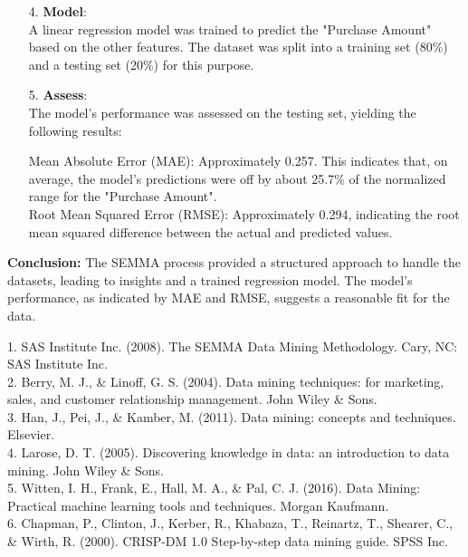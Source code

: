 \documentclass{article}
\begin{document}
\begin{itemize}
\item[4.]\textbf{Model}:\\A linear regression model was trained to predict the "Purchase Amount" based on the other features. The dataset was split into a training set (80\%) and a testing set (20\%) for this purpose.
\item[5.]\textbf{Assess}:\\The model's performance was assessed on the testing set, yielding the following results:

Mean Absolute Error (MAE): Approximately 0.257. This indicates that, on average, the model's predictions were off by about 25.7\% of the normalized range for the "Purchase Amount".\\
Root Mean Squared Error (RMSE): Approximately 0.294, indicating the root mean squared difference between the actual and predicted values.
\end{itemize}
\textbf{Conclusion:}
The SEMMA process provided a structured approach to handle the datasets, leading to insights and a trained regression model. The model's performance, as indicated by MAE and RMSE, suggests a reasonable fit for the data.


1. SAS Institute Inc. (2008). The SEMMA Data Mining Methodology. Cary, NC: SAS Institute Inc.\\
2. Berry, M. J., \& Linoff, G. S. (2004). Data mining techniques: for marketing, sales, and customer relationship management. John Wiley \& Sons.\\
3. Han, J., Pei, J., \& Kamber, M. (2011). Data mining: concepts and techniques. Elsevier.\\
4. Larose, D. T. (2005). Discovering knowledge in data: an introduction to data mining. John Wiley \& Sons.\\
5. Witten, I. H., Frank, E., Hall, M. A., \& Pal, C. J. (2016). Data Mining: Practical machine learning tools and techniques. Morgan Kaufmann.\\
6. Chapman, P., Clinton, J., Kerber, R., Khabaza, T., Reinartz, T., Shearer, C., \& Wirth, R. (2000). CRISP-DM 1.0 Step-by-step data mining guide. SPSS Inc.
\end{document}
